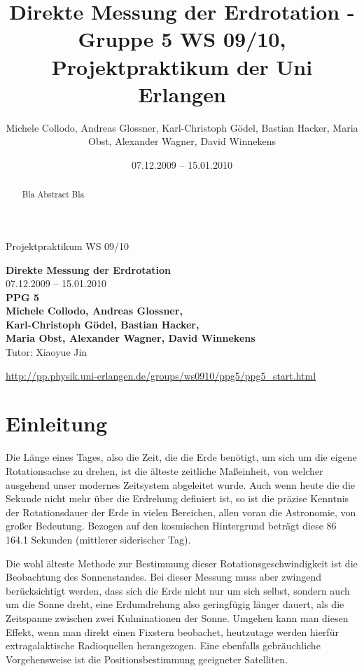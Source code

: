 \documentclass[11pt]{scrartcl}
\title{Direkte Messung der Erdrotation - Gruppe 5 WS 09/10, Projektpraktikum der Uni Erlangen}
\date{07.12.2009 -- 15.01.2010}
\author{Michele Collodo, Andreas Glossner, Karl-Christoph G\"odel, Bastian Hacker, Maria Obst, Alexander Wagner, David Winnekens}
\begin{document}
\sloppy %
\thispagestyle{empty}
\large{Projektpraktikum WS 09/10}
\hfill
{}
\\[8\baselineskip]
\begin{center}
{\fontsize{36}{54}\textbf{Direkte Messung der Erdrotation}}
\\[2\baselineskip]
{\Large 07.12.2009 -- 15.01.2010}
\\[7\baselineskip]
{\huge\textbf{PPG 5}}
\\[0.5\baselineskip]
{\large\textbf{
Michele Collodo,
Andreas Glossner,\\
Karl-Christoph G\"odel,
Bastian Hacker,\\
Maria Obst,
Alexander Wagner,
David Winnekens}\\
Tutor: Xiaoyue Jin}
\vfill



\small{\url{http://pp.physik.uni-erlangen.de/groups/ws0910/ppg5/ppg5\_start.html}}
\end{center}
\newpage



\tableofcontents
\vfill



\begin{abstract}
Bla Abstract Bla
\end{abstract}
\newpage

\section{Einleitung} %
Die Länge eines Tages, also die Zeit, die die Erde benötigt, um sich um die eigene Rotationsachse zu drehen, ist die älteste zeitliche Maßeinheit, von welcher ausgehend unser modernes Zeitsystem abgeleitet wurde. Auch wenn heute die die Sekunde nicht mehr über die Erdrehung definiert ist, so ist die präzise Kenntnis der Rotationsdauer der Erde in vielen Bereichen, allen voran die Astronomie, von großer Bedeutung. Bezogen auf den kosmischen Hintergrund beträgt diese 86\,164.1 Sekunden (mittlerer siderischer Tag).

Die wohl älteste Methode zur Bestimmung dieser Rotationsgeschwindigkeit ist die Beobachtung des Sonnenstandes.
Bei dieser Messung muss aber zwingend berücksichtigt werden, dass sich die Erde nicht nur um sich selbst, sondern auch um die Sonne dreht, eine Erdumdrehung also geringfügig länger dauert, als die Zeitspanne zwischen zwei Kulminationen der Sonne. Umgehen kann man diesen Effekt, wenn man direkt einen Fixstern beobachet, heutzutage werden hierfür extragalaktische Radioquellen herangezogen. Eine ebenfalls gebräuchliche Vorgehensweise ist die Positionsbestimmung geeigneter Satelliten.
\end{document}
